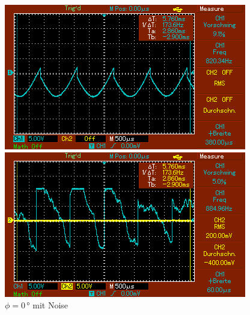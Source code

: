 \begin{figure}
    \begin{minipage}[b]{.45\linewidth} %
       \includegraphics[width=\linewidth]{bilder/MAP007.png}
       \caption{$\phi = 120\,\unit{°}$}
    \end{minipage}
    \hspace{0.1\linewidth}%
    \begin{minipage}[b]{.45\linewidth} %
       \includegraphics[width=\linewidth]{bilder/MAP011.png}
       \caption{$\phi = 0\,\unit{°}$ mit Noise}
    \end{minipage}
\end{figure}